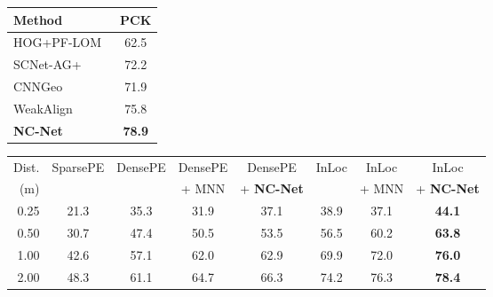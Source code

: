 \documentclass{article}
\begin{document}
 \begin{figure}[t]
  \begin{minipage}[t]{0.3\textwidth}
      \centering
    \setlength{\tabcolsep}{3pt}
    {\footnotesize 
    \begin{tabular}{lc}
    \toprule
    Method &
    PCK
    \\ \midrule
    HOG+PF-LOM~\cite{ham2017proposal}   &   62.5    \\   
    SCNet-AG+~\cite{scnet}              &   72.2    \\
    CNNGeo~\cite{Rocco17}               &   71.9    \\  
    WeakAlign~\cite{Rocco18}            &   75.8    \\
    \textbf{NC-Net}                              &   \textbf{78.9}    \\
     \bottomrule
    \end{tabular}
    }
    {\scriptsize 
     \label{tab:pf-pascal-baselines} }
  \end{minipage}
  \hfill
  \begin{minipage}[t]{0.68\textwidth}
   \centering
    \setlength{\tabcolsep}{2pt}
    {\footnotesize     
    \begin{tabular}{rccccccc}
    \toprule
 Dist. & 
 SparsePE & 
 DensePE & 
 DensePE & 
 DensePE & 
 InLoc & 
 InLoc & 
 InLoc \\
 (m) &
 \cite{Taira18} &
 \cite{Taira18} &
 + MNN &
 + \textbf{NC-Net} &
 \cite{Taira18} &
 + MNN &
 + \textbf{NC-Net} \\
    \midrule
0.25 & 21.3 & 35.3 & 31.9 & 37.1 & 38.9 & 37.1 & {\bf 44.1} \\
0.50 & 30.7 & 47.4 & 50.5 & 53.5 & 56.5 & 60.2 & {\bf 63.8} \\
1.00 & 42.6 & 57.1 & 62.0 & 62.9 & 69.9 & 72.0 & {\bf 76.0} \\
2.00 & 48.3 & 61.1 & 64.7 & 66.3 & 74.2 & 76.3 & {\bf 78.4} \\
     \bottomrule
    \end{tabular}
    \vspace{-3pt}
    }
  {\scriptsize
    }
    \end{minipage}
  \end{figure}
\end{document}
